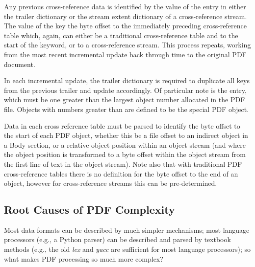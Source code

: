 Any previous cross-reference data is identified by the value of the  entry in either
the trailer dictionary or the stream extent dictionary of a cross-reference stream. The
value of the  key the byte offset to the immediately
preceding cross-reference table which, again, can either be a traditional
cross-reference table and to the start of the  keyword, or to a
cross-reference stream. This process repeats, working from the most recent incremental
update back through time to the original PDF document.

In each incremental update, the trailer dictionary is required to duplicate all keys from the previous
trailer and update accordingly. Of particular note is the  entry, which must be
one greater than the largest object number allocated in the PDF file. Objects with numbers greater
than  are defined to be the special PDF  object.

Data in each cross reference table must be parsed to
identify the byte offset to the start of each PDF object, whether this be a file offset to an indirect object in a Body section, or a relative object position within an object stream (and where the object position is transformed to a byte offset within the object stream from the first line of text in the object stream). Note also that with traditional PDF cross-reference tables there is no definition for the byte offset to the end of an object, however for cross-reference streams this can be pre-determined.


\subsection{Root Causes of PDF Complexity}
\label{sec:rootcause}

Most data formats can be described by much simpler mechanisms;
most language processors (e.g., a Python parser) can be described and parsed by
textbook methods (e.g., the old \emph{lex} and \emph{yacc} are sufficient for
most language processors);
so what makes PDF processing so much more complex?

